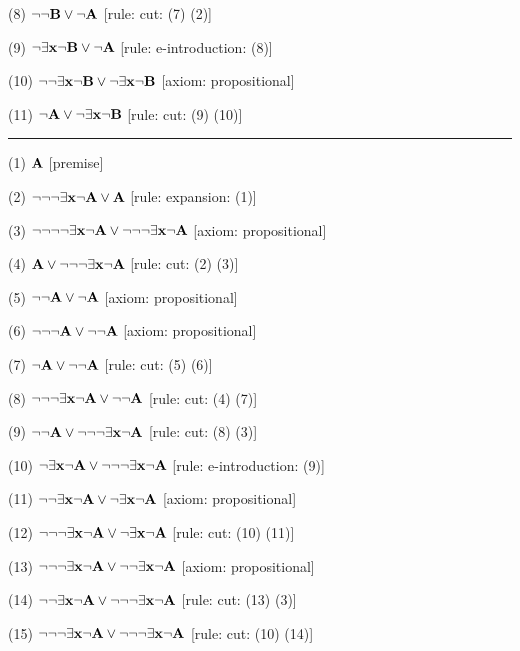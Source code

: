 \item{(8)} $\neg \neg {\bf B} \lor \neg {\bf A}$ \hfill [rule: cut: (7) (2)]
\item{(9)} $\neg \exists {\bf x} \neg {\bf B} \lor \neg {\bf A}$ \hfill [rule: e-introduction: (8)]
\item{(10)} $\neg \neg \exists {\bf x} \neg {\bf B} \lor \neg \exists {\bf x} \neg {\bf B}$ \hfill [axiom: propositional]
\item{(11)} $\neg {\bf A} \lor \neg \exists {\bf x} \neg {\bf B}$ \hfill [rule: cut: (9) (10)]
\medskip
\hrule
\medskip
\item{(1)} ${\bf A}$ \hfill [premise]
\item{(2)} $\neg \neg \neg \exists {\bf x} \neg {\bf A} \lor {\bf A}$ \hfill [rule: expansion: (1)]
\item{(3)} $\neg \neg \neg \neg \exists {\bf x} \neg {\bf A} \lor \neg \neg \neg \exists {\bf x} \neg {\bf A}$ \hfill [axiom: propositional]
\item{(4)} ${\bf A} \lor \neg \neg \neg \exists {\bf x} \neg {\bf A}$ \hfill [rule: cut: (2) (3)]
\item{(5)} $\neg \neg {\bf A} \lor \neg {\bf A}$ \hfill [axiom: propositional]
\item{(6)} $\neg \neg \neg {\bf A} \lor \neg \neg {\bf A}$ \hfill [axiom: propositional]
\item{(7)} $\neg {\bf A} \lor \neg \neg {\bf A}$ \hfill [rule: cut: (5) (6)]
\item{(8)} $\neg \neg \neg \exists {\bf x} \neg {\bf A} \lor \neg \neg {\bf A}$ \hfill [rule: cut: (4) (7)]
\item{(9)} $\neg \neg {\bf A} \lor \neg \neg \neg \exists {\bf x} \neg {\bf A}$ \hfill [rule: cut: (8) (3)]
\item{(10)} $\neg \exists {\bf x} \neg {\bf A} \lor \neg \neg \neg \exists {\bf x} \neg {\bf A}$ \hfill [rule: e-introduction: (9)]
\item{(11)} $\neg \neg \exists {\bf x} \neg {\bf A} \lor \neg \exists {\bf x} \neg {\bf A}$ \hfill [axiom: propositional]
\item{(12)} $\neg \neg \neg \exists {\bf x} \neg {\bf A} \lor \neg \exists {\bf x} \neg {\bf A}$ \hfill [rule: cut: (10) (11)]
\item{(13)} $\neg \neg \neg \exists {\bf x} \neg {\bf A} \lor \neg \neg \exists {\bf x} \neg {\bf A}$ \hfill [axiom: propositional]
\item{(14)} $\neg \neg \exists {\bf x} \neg {\bf A} \lor \neg \neg \neg \exists {\bf x} \neg {\bf A}$ \hfill [rule: cut: (13) (3)]
\item{(15)} $\neg \neg \neg \exists {\bf x} \neg {\bf A} \lor \neg \neg \neg \exists {\bf x} \neg {\bf A}$ \hfill [rule: cut: (10) (14)]
